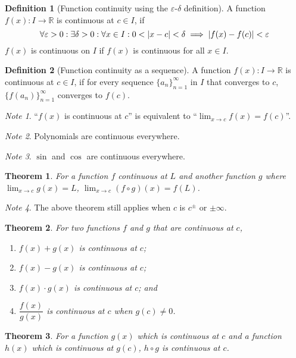 \documentclass{article}
\newcommand*{\R}{\mathbb{R}}
\theoremstyle{plain}
\newtheorem{theorem}{Theorem}[section]
\numberwithin{theorem}{subsection}
\theoremstyle{definition}
\newtheorem{definition}{Definition}[section]
\numberwithin{definition}{subsection}
\theoremstyle{remark}
\newtheorem{note}{Note}[section]
\numberwithin{note}{subsection}
\begin{document}
%
\begin{definition}[Function continuity using the $\varepsilon$-$\delta$ definition]
    A function $f(x):I\to\R$ is continuous at $c \in I$, if
    \begin{equation*}
        \forall\varepsilon>0: \exists\delta>0: \forall x\in I:0<\abs{x-c}<\delta \implies \abs{f(x)-f(c)}<\varepsilon
    \end{equation*}
    $f(x)$ is continuous on $I$ if $f(x)$ is continuous for all $x \in I$.
\end{definition}
%
\begin{definition}[Function continuity as a sequence]
    A function $f(x):I\to\R$ is continuous at $c \in I$, if
    for every sequence $\{a_n\}^{\infty}_{n=1}$ in $I$ that converges to $c$,
    $\{f(a_n)\}^{\infty}_{n=1}$ converges to $f(c)$.
\end{definition}
%
\begin{note}
    ``$f(x)$ is continuous at $c$'' is equivalent to
    ``$\displaystyle \lim_{x\to c} f(x) = f(c)$''.
\end{note}
%
\begin{note}
    Polynomials are continuous everywhere.
\end{note}
%
\begin{note}
    $\sin$ and $\cos$ are continuous everywhere.
\end{note}
%
\begin{theorem}
    For a function $f$ continuous at $L$
    and another function $g$ where $\displaystyle \lim_{x\to c}g(x) = L$,
    $\displaystyle \lim_{x\to c} (f \circ g)(x) = f(L)$.
\end{theorem}
\begin{note}
    The above theorem still applies when $c$ is $c^\pm$ or $\pm\infty$.
\end{note}
%
\begin{theorem}
    For two functions $f$ and $g$ that are continuous at $c$,
    \begin{enumerate}[label=\normalfont\alph*)]
        \item $f(x) + g(x)$ is continuous at $c$;
        \item $f(x) - g(x)$ is continuous at $c$;
        \item $f(x) \cdot g(x)$ is continuous at $c$; and
        \item $\dfrac{f(x)}{g(x)}$ is continuous at $c$ when $g(c)\ne0$.
    \end{enumerate}
\end{theorem}
%
\begin{theorem}
    For a function $g(x)$ which is continuous at $c$ and
    a function $h(x)$ which is continuous at $g(c)$,
    $h \circ g$ is continuous at $c$.
\end{theorem}
\end{document}
